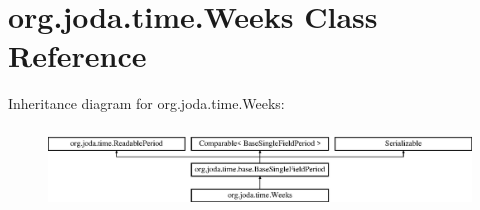 \hypertarget{classorg_1_1joda_1_1time_1_1_weeks}{\section{org.\-joda.\-time.\-Weeks Class Reference}
\label{classorg_1_1joda_1_1time_1_1_weeks}
}
Inheritance diagram for org.\-joda.\-time.\-Weeks\-:\begin{figure}[H]
\begin{center}
\leavevmode
\includegraphics[height=2.187500cm]{classorg_1_1joda_1_1time_1_1_weeks}
\end{center}
\end{figure}
